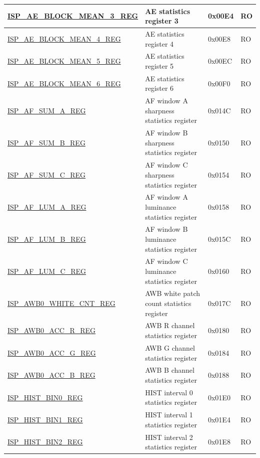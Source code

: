 \begin{longtable}{ | p{6cm} | p{7.2cm} | p{1.3cm} | p{1cm} | }
\hyperref[regdesc:ISPAEBLOCKMEAN3REG]{ISP\_AE\_BLOCK\_MEAN\_3\_REG} & AE statistics register 3 & 0x00E4 & RO \\ \hline
\hyperref[regdesc:ISPAEBLOCKMEAN4REG]{ISP\_AE\_BLOCK\_MEAN\_4\_REG} & AE statistics register 4 & 0x00E8 & RO \\ \hline
\hyperref[regdesc:ISPAEBLOCKMEAN5REG]{ISP\_AE\_BLOCK\_MEAN\_5\_REG} & AE statistics register 5 & 0x00EC & RO \\ \hline
\hyperref[regdesc:ISPAEBLOCKMEAN6REG]{ISP\_AE\_BLOCK\_MEAN\_6\_REG} & AE statistics register 6 & 0x00F0 & RO \\ \hline
\hyperref[regdesc:ISPAFSUMAREG]{ISP\_AF\_SUM\_A\_REG} & AF window A sharpness statistics register & 0x014C & RO \\ \hline
\hyperref[regdesc:ISPAFSUMBREG]{ISP\_AF\_SUM\_B\_REG} & AF window B sharpness statistics register & 0x0150 & RO \\ \hline
\hyperref[regdesc:ISPAFSUMCREG]{ISP\_AF\_SUM\_C\_REG} & AF window C sharpness statistics register & 0x0154 & RO \\ \hline
\hyperref[regdesc:ISPAFLUMAREG]{ISP\_AF\_LUM\_A\_REG} & AF window A luminance statistics register & 0x0158 & RO \\ \hline
\hyperref[regdesc:ISPAFLUMBREG]{ISP\_AF\_LUM\_B\_REG} & AF window B luminance statistics register & 0x015C & RO \\ \hline
\hyperref[regdesc:ISPAFLUMCREG]{ISP\_AF\_LUM\_C\_REG} & AF window C luminance statistics register & 0x0160 & RO \\ \hline
\hyperref[regdesc:ISPAWB0WHITECNTREG]{ISP\_AWB0\_WHITE\_CNT\_REG} & AWB white patch count statistics register & 0x017C & RO \\ \hline
\hyperref[regdesc:ISPAWB0ACCRREG]{ISP\_AWB0\_ACC\_R\_REG} & AWB R channel statistics register & 0x0180 & RO \\ \hline
\hyperref[regdesc:ISPAWB0ACCGREG]{ISP\_AWB0\_ACC\_G\_REG} & AWB G channel statistics register & 0x0184 & RO \\ \hline
\hyperref[regdesc:ISPAWB0ACCBREG]{ISP\_AWB0\_ACC\_B\_REG} & AWB B channel statistics register & 0x0188 & RO \\ \hline
\hyperref[regdesc:ISPHISTBIN0REG]{ISP\_HIST\_BIN0\_REG} & HIST interval 0 statistics register  & 0x01E0 & RO \\ \hline
\hyperref[regdesc:ISPHISTBIN1REG]{ISP\_HIST\_BIN1\_REG} & HIST interval 1 statistics register  & 0x01E4 & RO \\ \hline
\hyperref[regdesc:ISPHISTBIN2REG]{ISP\_HIST\_BIN2\_REG} & HIST interval 2 statistics register  & 0x01E8 & RO \\ \hline

\end{longtable}
